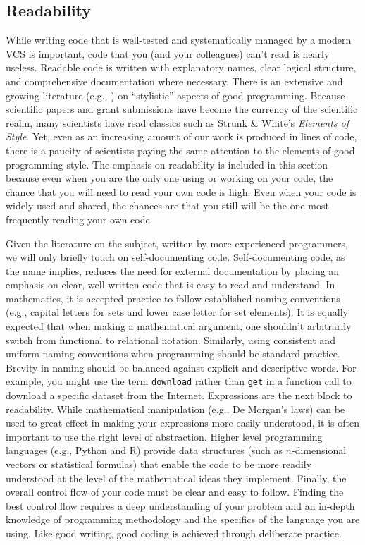 \documentclass[ChapterTOCs,krantz2]{krantz} %
\begin{document}
\subsection{\label{subsec:readability}Readability}

While writing code that is well-tested and systematically managed by a modern
VCS is important, code that you (and your colleagues) can't read is nearly
useless. Readable code is written with explanatory names, clear logical
structure, and comprehensive documentation where necessary.  There is an
extensive and growing literature (e.g., \cite{boswell2011art, Fow00,
kernighan1999practice, HT00, mcconnell2009code}) on ``stylistic'' aspects of
good programming. Because scientific papers and grant submissions have become
the currency of the scientific realm, many scientists have read classics such
as Strunk \& White's \emph{Elements of Style}. Yet, even as an increasing
amount of our work is produced in lines of code, there is a paucity of
scientists paying the same attention to the elements of good programming style.
The emphasis on readability is included in this section because even when you
are the only one using or working on your code, the chance that you will need
to read your own code is high. Even when your code is widely used and shared,
the chances are that you still will be the one most frequently reading your own
code.

Given the literature on the subject, written by more experienced programmers,
we will only briefly touch on self-documenting code. Self-documenting code, as
the name implies, reduces the need for external documentation by placing an
emphasis on clear, well-written code that is easy to read and understand.  In
mathematics, it is accepted practice to follow established naming conventions
(e.g., capital letters for sets and lower case letter for set elements). It is
equally expected that when making a mathematical argument, one shouldn't
arbitrarily switch from functional to relational notation.  Similarly, using
consistent and uniform naming conventions when programming should be standard
practice. Brevity in naming should be balanced against explicit and descriptive
words. For example, you might use the term \texttt{download} rather than
\texttt{get} in a function call to download a specific dataset from the
Internet. Expressions are the next block to readability. While mathematical
manipulation (e.g., De Morgan's laws) can be used to great effect in making
your expressions more easily understood, it is often important to use the right
level of abstraction. Higher level programming languages (e.g., Python and R)
provide data structures (such as $n$-dimensional vectors or statistical
formulas) that enable the code to be more readily understood at the level of
the mathematical ideas they implement. Finally, the overall control flow of
your code must be clear and easy to follow. Finding the best control flow
requires a deep understanding of your problem and an in-depth knowledge of
programming methodology and the specifics of the language you are using.
Like good writing, good coding is achieved through deliberate practice.
\end{document}
